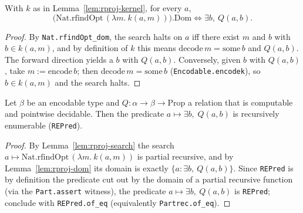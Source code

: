 \begin{lemma}
    \label{lem:rproj-dom}
    \leanok
    With $k$ as in Lemma~\ref{lem:rproj-kernel}, for every $a$,
    \[
        \bigl(\mathrm{Nat.rfindOpt}\,(\lambda m.\ k(a,m))\bigr).\mathrm{Dom}
        \iff \exists b,\ Q(a,b).
    \]
\end{lemma}
\begin{proof}
    By \texttt{Nat.rfindOpt\_dom}, the search halts on $a$ iff there exist $m$ and
    $b$ with $b \in k(a,m)$, and by definition of $k$ this means
    $\mathrm{decode}\,m = \mathrm{some}\,b$ and $Q(a,b)$. The forward direction
    yields a $b$ with $Q(a,b)$. Conversely, given $b$ with $Q(a,b)$, take
    $m := \mathrm{encode}\,b$; then $\mathrm{decode}\,m = \mathrm{some}\,b$
    (\texttt{Encodable.encodek}), so $b \in k(a,m)$ and the search halts.
\end{proof}

\begin{lemma}
    \label{lem:re-projection}
    Let $\beta$ be an encodable type and $Q : \alpha \to \beta \to \mathrm{Prop}$
    a relation that is computable and pointwise decidable. Then the predicate
    $a \mapsto \exists b,\; Q(a, b)$ is recursively enumerable
    (\texttt{REPred}).
\end{lemma}
\begin{proof}
    By Lemma~\ref{lem:rproj-search} the search
    $a \mapsto \mathrm{Nat.rfindOpt}\,(\lambda m.\ k(a,m))$ is partial recursive,
    and by Lemma~\ref{lem:rproj-dom} its domain is exactly
    $\{a : \exists b,\ Q(a,b)\}$. Since \texttt{REPred} is by definition the
    predicate cut out by the domain of a partial recursive function (via the
    \texttt{Part.assert} witness), the predicate $a \mapsto \exists b,\ Q(a,b)$ is
    \texttt{REPred}; conclude with \texttt{REPred.of\_eq} (equivalently
    \texttt{Partrec.of\_eq}).
\end{proof}

